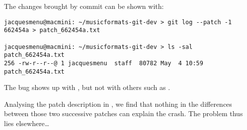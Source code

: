 The changes brought by commit \code{} can be shown with: %
\begin{lstlisting}[language=Terminal]
jacquesmenu@macmini: ~/musicformats-git-dev > git log --patch -1 662454a > patch_662454a.txt

jacquesmenu@macmini: ~/musicformats-git-dev > ls -sal patch_662454a.txt
256 -rw-r--r--@ 1 jacquesmenu  staff  80782 May  4 10:59 patch_662454a.txt
\end{lstlisting}

The bug shows up with , but not with others such as .

Analysing the patch description in , we find that nothing in the differences between those two successive patches can explain  the crash. The problem thus lies elsewhere\dots



